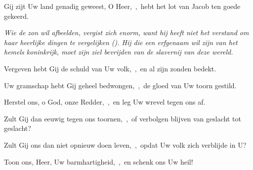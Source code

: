 \documentclass[12pt,twoside,a5paper]{article}
\begin{document}



\begin{halfparskip}

  Gij zijt Uw land genadig geweest, O Heer,~\sep\ hebt het lot van Jacob ten goede gekeerd.


  \liturgicallbracket{} \emph{Wie de zon wil afbeelden, vergist zich enorm, want hij heeft niet het verstand om haar heerlijke dingen te vergelijken (). Hij die een erfgenaam wil zijn van het hemels koninkrijk, moet zijn ziel bevrijden van de slavernij van deze wereld.}\liturgicalrbracket

  Vergeven hebt Gij de schuld van Uw volk,~\sep\ en al zijn zonden bedekt.

  Uw gramschap hebt Gij geheel bedwongen,~\sep\ de gloed van Uw toorn gestild.
\end{halfparskip}

\begin{halfparskip}

  Herstel ons, o God, onze Redder,~\sep\ en leg Uw wrevel tegen ons af.

  Zult Gij dan eeuwig tegen ons toornen,~\sep\ of verbolgen blijven van geslacht tot geslacht?

  Zult Gij ons dan niet opnieuw doen leven,~\sep\ opdat Uw volk zich verblijde in U?

  Toon ons, Heer, Uw barmhartigheid,~\sep\ en schenk ons Uw heil!
\end{halfparskip}
\end{document}
